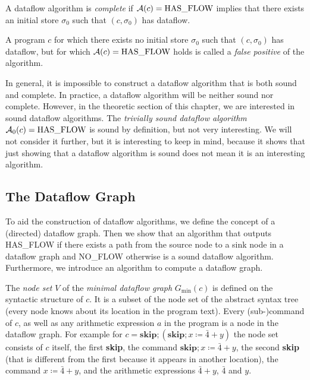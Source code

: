 \begin{definition}[Completeness]
    A dataflow algorithm is \emph{complete} if $\operatorname{\mathcal{A}}(c) = \text{HAS\_FLOW}$
    implies that there exists an initial store $\sigma_0$
     such that $(c, \sigma_0)$ has dataflow.
\end{definition}
\begin{definition}
    A program $c$ for which there exists no initial store $\sigma_0$ such that 
    $(c, \sigma_0)$ has dataflow, but for which $\operatorname{\mathcal{A}}(c) = \text{HAS\_FLOW}$ holds
    is called a \emph{false positive} of the algorithm.
\end{definition}
\begin{remark}
    In general, it is impossible to construct a dataflow algorithm that is both 
    sound and complete.
    In practice, a dataflow algorithm will be neither sound nor complete.
    However, in the theoretic section of this chapter, we are interested in 
    sound dataflow algorithms.
    The \emph{trivially sound dataflow algorithm} $\operatorname{\mathcal{A}}_0(c) = \text{HAS\_FLOW}$ 
    is sound by definition, but not very interesting.
    We will not consider it further, but it is interesting to keep in mind,
    because it shows that just showing that a dataflow algorithm is sound does not
    mean it is an interesting algorithm.    
\end{remark}

\subsection{The Dataflow Graph}
To aid the construction of dataflow algorithms, we define the concept
of a (directed) dataflow graph.
Then we show that an algorithm that outputs HAS\_FLOW if 
there exists a path from the source 
node to a sink node in a dataflow graph and NO\_FLOW otherwise
is a sound dataflow algorithm.
Furthermore, we introduce an algorithm to compute a dataflow graph.

The \emph{node set} $V$ of the \emph{minimal dataflow graph} $G_\text{min}(c)$
is defined on the syntactic structure
of $c$. It is a subset of the node set of the abstract syntax tree
(every node knows about its location in the program text).
Every (sub-)command of $c$, as well as any arithmetic expression $a$ in the 
program is a node in the dataflow graph.
For example for
$c = \textbf{skip}; (\textbf{skip}; x \coloneqq \bar{4} + y)$
the node set consists of $c$ itself, the first \textbf{skip}, the command 
$\textbf{skip}; x \coloneqq \bar{4} + y$, the second \textbf{skip} (that is different 
from the first because it appears in another location), the command
$x \coloneqq \bar{4} + y$, and the arithmetic expressions $\bar{4}+y$,
$\bar{4}$ and $y$.

